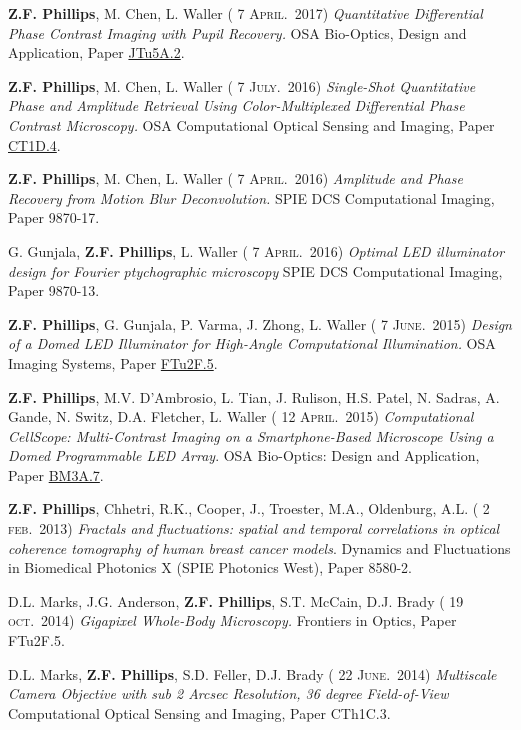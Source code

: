 \documentclass[12pt,letterpaper]{article}
\renewcommand{\date}[1]{{} #1}
\begin{document}
\textbf{Z.F. Phillips}, M. Chen, L. Waller (\date{7 \textsc{April.}~2017})
\emph{Quantitative Differential Phase Contrast Imaging with Pupil Recovery.} OSA Bio-Optics, Design and Application, Paper \href{https://www.osapublishing.org/abstract.cfm?uri=BODA-2017-JTu5A.2}{JTu5A.2}.
\medskip

\textbf{Z.F. Phillips}, M. Chen, L. Waller (\date{7 \textsc{July.}~2016})
\emph{Single-Shot Quantitative Phase and Amplitude Retrieval Using Color-Multiplexed Differential Phase Contrast Microscopy.} OSA Computational Optical Sensing and Imaging, Paper \href{https://www.osapublishing.org/abstract.cfm?uri=COSI-2016-CT1D.4}{CT1D.4}.
\medskip

\textbf{Z.F. Phillips}, M. Chen, L. Waller (\date{7 \textsc{April.}~2016})
\emph{Amplitude and Phase Recovery from Motion Blur  \linebreak Deconvolution.} SPIE DCS Computational Imaging, Paper 9870-17.
\medskip

G. Gunjala, \textbf{Z.F. Phillips}, L. Waller (\date{7 \textsc{April.}~2016})
\emph{Optimal LED illuminator design for Fourier  \linebreak ptychographic microscopy} SPIE DCS Computational Imaging, Paper 9870-13.
\medskip

\textbf{Z.F. Phillips}, G. Gunjala, P. Varma, J. Zhong, L. Waller (\date{7 \textsc{June.}~2015})
\emph{Design of a Domed LED  \linebreak Illuminator for High-Angle Computational Illumination.} OSA Imaging Systems, Paper \href{https://www.osapublishing.org/abstract.cfm?uri=ISA-2015-ITh1A.2}{FTu2F.5}.
\medskip

\textbf{Z.F. Phillips}, M.V. D'Ambrosio, L. Tian, J. Rulison, H.S. Patel, N. Sadras, A. Gande, N. Switz,  \linebreak D.A. Fletcher, L. Waller (\date{12 \textsc{April.}~2015})
\emph{Computational CellScope: Multi-Contrast Imaging on a  \linebreak Smartphone-Based Microscope Using a Domed Programmable LED Array}. OSA Bio-Optics:  \linebreak Design and Application, Paper \href{https://www.osapublishing.org/abstract.cfm?uri=BODA-2015-BM3A.7}{BM3A.7}.
\medskip

\textbf{Z.F. Phillips}, Chhetri, R.K., Cooper, J., Troester, M.A., Oldenburg, A.L. (\date{2 \textsc{feb.}~2013})
\emph{Fractals and  \linebreak fluctuations: spatial and temporal correlations in optical coherence tomography of human breast  \linebreak cancer models}. Dynamics and Fluctuations in Biomedical Photonics X (SPIE Photonics West), Paper 8580-2.
\medskip

D.L. Marks, J.G. Anderson, \textbf{Z.F. Phillips}, S.T. McCain, D.J. Brady (\date{19 \textsc{oct.}~2014})
\emph{Gigapixel  \linebreak Whole-Body Microscopy.} Frontiers in Optics, Paper FTu2F.5.
\medskip

D.L. Marks, \textbf{Z.F. Phillips}, S.D. Feller, D.J. Brady (\date{22 \textsc{June.}~2014})
\emph{Multiscale Camera Objective with sub 2 Arcsec Resolution, 36 degree Field-of-View} Computational Optical Sensing and Imaging,  \linebreak Paper CTh1C.3.
\medskip
\end{document}
